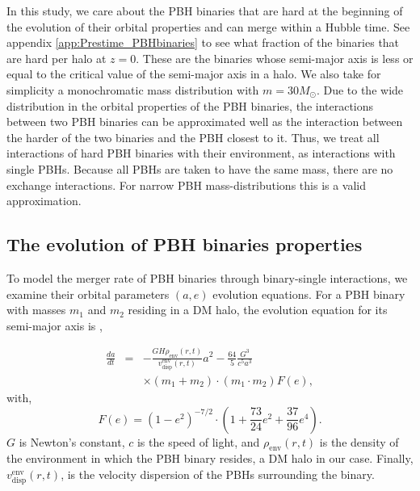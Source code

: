 \documentclass[aps, prd, reprint, nofootinbib]{revtex4-2}
\begin{document}
In this study, we care about the PBH binaries that are hard at the beginning of the evolution of their orbital properties and can merge within a Hubble time. See appendix \ref{app:Prestime_PBHbinaries} to  see  what fraction of the binaries that are hard per halo at $z=0$. These are the binaries whose semi-major axis is less or equal to the critical value of the semi-major axis in a halo. We also take for simplicity a monochromatic mass distribution with $m=30 M_{\odot}$.
Due to the wide distribution in the orbital properties of the PBH binaries, the interactions between two PBH binaries can be approximated well as the interaction between the harder of the two binaries and the PBH closest to it. 
Thus, we treat all interactions of hard PBH binaries with their environment, as interactions with single PBHs. Because all PBHs are taken to have the same mass, there are no exchange interactions. For narrow PBH mass-distributions this is a valid approximation.

\subsection{The evolution of PBH binaries properties}
To model the merger rate of PBH binaries through binary-single interactions, we examine their orbital parameters $(a,e)$ evolution equations. 
For a PBH binary with masses $m_1$ and $m_2$ residing in a DM halo, the evolution equation for its semi-major axis is \cite{Peters},

\begin{eqnarray}
\label{eq:peters}
 \frac{da}{dt}&=&-\frac{G H \rho_{\textrm{env}}(r,t)}{v_{\textrm{disp}}^{\textrm{env}}(r,t)} a^2-\frac{64}{5} \frac{G^3}{c^5 a^3} \nonumber \\
&&\times \left(m_1+m_2\right) \cdot\left(m_1 \cdot m_2\right)F(e),
\end{eqnarray}
with, 
\begin{equation}
\label{eq:Fe_func}
F(e)=\left(1-e^2\right)^{-7 / 2} \cdot\left(1+\frac{73}{24} e^2+\frac{37}{96} e^4\right).
\end{equation}
$G$ is Newton's constant, $c$ is the speed of light, and $\rho_{\textrm{env}}(r,t)$ is the density of the environment in which the PBH binary resides, a DM halo in our case. 
Finally, $v_{\textrm{disp}}^{\textrm{env}}(r,t)$, is the velocity dispersion of the PBHs surrounding the binary.
\end{document}

